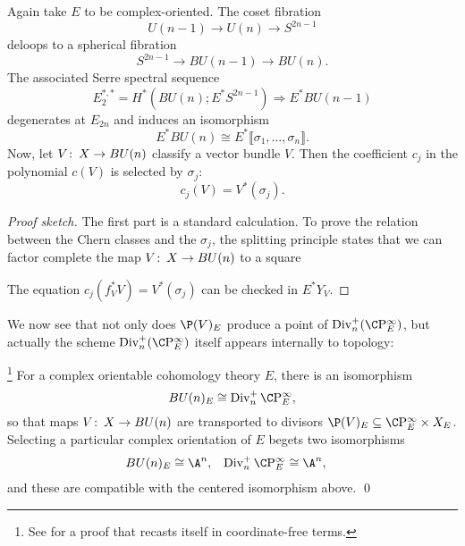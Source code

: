 \begin{theorem}\label{ChernClassesAreSymmInChernRoots}
Again take $E$ to be complex-oriented.  The coset fibration \[U(n-1) \to U(n) \to S^{2n-1}\] deloops to a spherical fibration \[S^{2n-1} \to BU(n-1) \to BU(n).\]  The associated Serre spectral sequence \[E_2^{*, *} = H^*(BU(n); E^* S^{2n-1}) \Rightarrow E^* BU(n-1)\] degenerates at $E_{2n}$ and induces an isomorphism \[E^* BU(n) \cong E^* \llbracket \sigma_1, \ldots, \sigma_n\rrbracket.\]  Now, let $V\colon\thinspace X \to BU(n)$ classify a vector bundle $V$.  Then the coefficient $c_j$ in the polynomial $c(V)$ is selected by $\sigma_j$: \[c_j(V) = V^*(\sigma_j).\]
\end{theorem}
\begin{proof}[Proof sketch]
The first part is a standard calculation.  To prove the relation between the Chern classes and the $\sigma_j$, the splitting principle states that we can factor complete the map $V\colon\thinspace X \to BU(n)$ to a square
\begin{center}
\end{center}
The equation $c_j(f_V^* V) = V^*(\sigma_j)$ can be checked in $E^* Y_V$.
\end{proof}

We now see that not only does $\P(V)_E$ produce a point of $\Div_n^+(\CP^\infty_E)$, but actually the scheme $\Div_n^+(\CP^\infty_E)$ itself appears internally to topology:

\begin{corollary}\footnote{See \cite[Proposition 8.31]{StricklandFSFG} for a proof that recasts  itself in coordinate-free terms.}\label{IdentificationOfBUnWithDivn}
For a complex orientable cohomology theory $E$, there is an isomorphism \[BU(n)_E \cong \Div_n^+ \CP^\infty_E,\] so that maps $V\colon\thinspace X \to BU(n)$ are transported to divisors $\P(V)_E \subseteq \CP^\infty_E \times X_E$.  Selecting a particular complex orientation of $E$ begets two isomorphisms
\begin{align*}
BU(n)_E & \cong \A^n, &
\Div_n^+ \CP^\infty_E & \cong \A^n,
\end{align*}
and these are compatible with the centered isomorphism above. \qed
\end{corollary}

